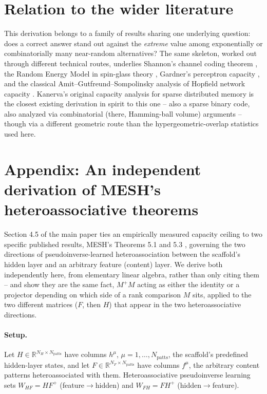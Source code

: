 \documentclass[11pt]{article}
\begin{document}
\section{Relation to the wider literature}

This derivation belongs to a family of results sharing one underlying question: does a correct
answer stand out against the \emph{extreme} value among exponentially or combinatorially many
near-random alternatives? The same skeleton, worked out through different technical routes,
underlies Shannon's channel coding theorem \cite{coverthomas}, the Random Energy Model in
spin-glass theory \cite{mezardmontanari2009}, Gardner's perceptron capacity
\cite{gardner1988}, and the classical Amit--Gutfreund--Sompolinsky analysis of Hopfield network
capacity \cite{ags1987}. Kanerva's original capacity analysis for sparse distributed memory
\cite{kanerva1988} is the closest existing derivation in spirit to this one -- also a sparse
binary code, also analyzed via combinatorial (there, Hamming-ball volume) arguments -- though
via a different geometric route than the hypergeometric-overlap statistics used here.

\section{Appendix: An independent derivation of MESH's heteroassociative theorems}
\label{sec:mesh-derivation}

Section 4.5 of the main paper ties an empirically measured capacity ceiling to two specific
published results, MESH's Theorems 5.1 and 5.3 \cite{sharma2022}, governing the two directions of
pseudoinverse-learned heteroassociation between the scaffold's hidden layer and an arbitrary
feature (content) layer. We derive both independently here, from elementary linear algebra, rather
than only citing them -- and show they are the same fact, $M^+M$ acting as either the identity or
a projector depending on which side of a rank comparison $M$ sits, applied to the two different
matrices ($F$, then $H$) that appear in the two heteroassociative directions.

\paragraph{Setup.} Let $H\in\mathbb{R}^{N_H\times N_{\mathrm{patts}}}$ have columns $h^\mu$,
$\mu=1,\dots,N_{\mathrm{patts}}$, the scaffold's predefined hidden-layer states, and let
$F\in\mathbb{R}^{N_F\times N_{\mathrm{patts}}}$ have columns $f^\mu$, the arbitrary content
patterns heteroassociated with them. Heteroassociative pseudoinverse learning sets
$W_{HF}=HF^+$ (feature$\to$hidden) and $W_{FH}=FH^+$ (hidden$\to$feature).
\end{document}
